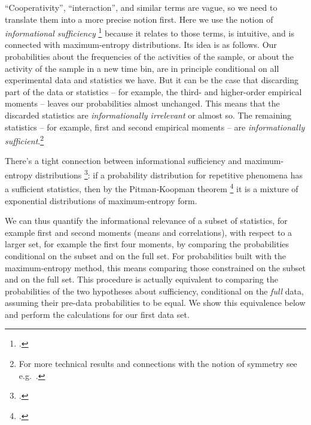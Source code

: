 \documentclass[\ifafour a4paper,12pt,\else a5paper,10pt,\fi%
onecolumn,oneside,article,%
british%
]{memoir}
\theoremstyle{remark}
\theoremstyle{innote}
\newcommand*{\citep}{\footcites}
\newcommand*{\amp}{\&}
\renewcommand*{\|}{\nonscript\,\vert\nonscript\;\mathopen{}}
\newcommand*{\sect}{\S}%
\newcommand*{\chap}{ch.}%
\newcommand*{\eg}{{e.g.}}
\begin{document}
\enquote{Cooperativity}, \enquote{interaction}, and similar terms are
vague, so we need to translate them into a more precise notion first. Here
we use the notion of \emph{informational sufficiency}
\citep[\sect~4.5]{bernardoetal1994}[\chap~8 \amp\
\sect~14.2]{jaynes1994_r2003}{cifarellietal1982,kullbacketal1951}[the
notion goes back to][]{fisher1922} because it relates to those terms, is
intuitive, and is connected with maximum-entropy distributions. Its idea is
as follows. Our probabilities about the frequencies of the activities of
the sample, or about the activity of the sample in a new time bin, are in
principle conditional on all experimental data and statistics we have. But
it can be the case that discarding part of the data or statistics -- for
example, the third- and higher-order empirical moments -- leaves our
probabilities almost unchanged. This means that the discarded statistics
are \emph{informationally irrelevant} or almost so. The remaining
statistics -- for example, first and second empirical moments -- are
\emph{informationally sufficient}.\footnote{For more technical results and
  connections with the notion of symmetry see \eg\
  \cite{darmois1935,neyman1935,koopman1936,pitman1936,halmosetal1949,bahadur1954,berk1972,lauritzen1974,lauritzen1982_r1988,lauritzen2007,cifarellietal1980,cifarellietal1981,diaconisetal1981,diaconis1992,furmanczyketal1998,fortinietal2000,nogalesetal2000,kallenberg2005,ayetal2015}.}

There's a tight connection between informational sufficiency and
maximum-entropy distributions
\citep{jaynes1982b}[\sect~4.5.4]{bernardoetal1994}: if a probability
distribution for repetitive phenomena has a sufficient statistics, then by
the Pitman-Koopman theorem \citep{koopman1936,pitman1936,darmois1935}[for
later analyses and the discrete case
see][]{hipp1974,andersen1970,denny1967,denny1972,fraser1963,barankinetal1963,barndorffnielsen1978_r2014}
it is a mixture of exponential distributions of maximum-entropy form.



We can thus quantify the informational relevance of a subset of statistics,
for example first and second moments (means and correlations), with respect
to a larger set, for example the first four moments, by comparing the
probabilities conditional on the subset and on the full set. For
probabilities built with the maximum-entropy method, this means comparing
those constrained on the subset and on the full set. This procedure is
actually equivalent to comparing the probabilities of the two hypotheses
about sufficiency, conditional on the \emph{full} data, assuming their
pre-data probabilities to be equal. We show this equivalence below and
perform the calculations for our first data set.
\medskip
\end{document}
